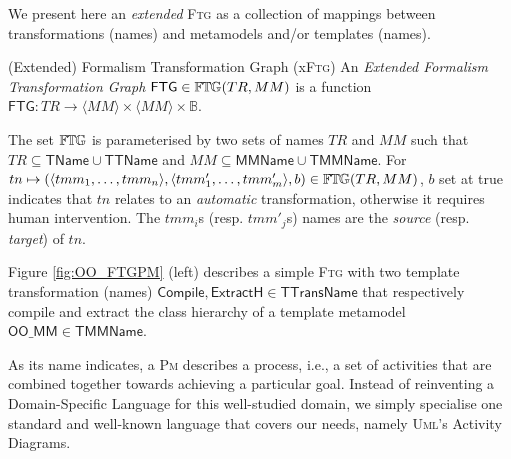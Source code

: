 We present here an \emph{extended} \textsc{Ftg} as a collection of mappings 
between transformations (names) and metamodels and/or templates (names). 

\begin{Definition}{(Extended) Formalism Transformation Graph (x\textsc{Ftg})}
An \emph{Extended Formalism Transformation Graph} $\mathsf{FTG} \in \mathbb{F}\mskip-1mu\mathbb{T}\mskip-1mu\mathbb{G}(TR, 
MM)$ is a function  $\mathsf{FTG} \colon TR \to \langle MM \rangle \times 
\langle MM \rangle \times \mathbb{B}$.
\end{Definition}
\noindent
The set $\mathbb{F}\mskip-1mu\mathbb{T}\mskip-1mu\mathbb{G}$ is parameterised by two sets of names $TR$ and $MM$ such that 
$TR\subseteq \mathsf{TName}\cup \mathsf{TTName}$ and $MM\subseteq 
\mathsf{MMName} \cup \mathsf{TMMName}$. 
For $tn \mapsto (\langle tmm_1, \ldots, tmm_n 
\rangle, \langle tmm'_1, \ldots, tmm'_m \rangle, b)\in \mathbb{F}\mskip-1mu\mathbb{T}\mskip-1mu\mathbb{G}(TR, MM)$, $b$ 
set at true indicates that $tn$ relates to an \emph{automatic} 
transformation, otherwise it requires human intervention. The $tmm_i$s 
(resp. $tmm'_j$s) names are the \emph{source} (resp. \emph{target}) of $tn$.


Figure \ref{fig:OO_FTGPM} (left) describes a simple \textsc{Ftg} with two 
template transformation (names) $\mathsf{Compile}, \mathsf{ExtractH}\in 
\mathsf{TTransName}$ that respectively compile and extract the class hierarchy 
of a template metamodel $\mathsf{OO\_MM}\in\mathsf{TMMName}$.

\medskip
As its name indicates, a \textsc{Pm} describes a process, i.e., a set of 
activities that are combined together towards achieving a particular goal. 
Instead of reinventing a Domain-Specific Language for this well-studied domain, 
we simply specialise one standard and well-known language that covers our 
needs, namely \textsc{Uml}'s Activity Diagrams.

